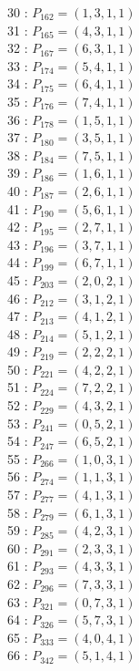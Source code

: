 \documentclass{article}
\begin{document}
{\begin{multicols}{3}
30 : $P_{162}=( 1, 3, 1, 1 )$\\
31 : $P_{165}=( 4, 3, 1, 1 )$\\
32 : $P_{167}=( 6, 3, 1, 1 )$\\
33 : $P_{174}=( 5, 4, 1, 1 )$\\
34 : $P_{175}=( 6, 4, 1, 1 )$\\
35 : $P_{176}=( 7, 4, 1, 1 )$\\
36 : $P_{178}=( 1, 5, 1, 1 )$\\
37 : $P_{180}=( 3, 5, 1, 1 )$\\
38 : $P_{184}=( 7, 5, 1, 1 )$\\
39 : $P_{186}=( 1, 6, 1, 1 )$\\
40 : $P_{187}=( 2, 6, 1, 1 )$\\
41 : $P_{190}=( 5, 6, 1, 1 )$\\
42 : $P_{195}=( 2, 7, 1, 1 )$\\
43 : $P_{196}=( 3, 7, 1, 1 )$\\
44 : $P_{199}=( 6, 7, 1, 1 )$\\
45 : $P_{203}=( 2, 0, 2, 1 )$\\
46 : $P_{212}=( 3, 1, 2, 1 )$\\
47 : $P_{213}=( 4, 1, 2, 1 )$\\
48 : $P_{214}=( 5, 1, 2, 1 )$\\
49 : $P_{219}=( 2, 2, 2, 1 )$\\
50 : $P_{221}=( 4, 2, 2, 1 )$\\
51 : $P_{224}=( 7, 2, 2, 1 )$\\
52 : $P_{229}=( 4, 3, 2, 1 )$\\
53 : $P_{241}=( 0, 5, 2, 1 )$\\
54 : $P_{247}=( 6, 5, 2, 1 )$\\
55 : $P_{266}=( 1, 0, 3, 1 )$\\
56 : $P_{274}=( 1, 1, 3, 1 )$\\
57 : $P_{277}=( 4, 1, 3, 1 )$\\
58 : $P_{279}=( 6, 1, 3, 1 )$\\
59 : $P_{285}=( 4, 2, 3, 1 )$\\
60 : $P_{291}=( 2, 3, 3, 1 )$\\
61 : $P_{293}=( 4, 3, 3, 1 )$\\
62 : $P_{296}=( 7, 3, 3, 1 )$\\
63 : $P_{321}=( 0, 7, 3, 1 )$\\
64 : $P_{326}=( 5, 7, 3, 1 )$\\
65 : $P_{333}=( 4, 0, 4, 1 )$\\
66 : $P_{342}=( 5, 1, 4, 1 )$\\

\end{multicols}}
\end{document}
